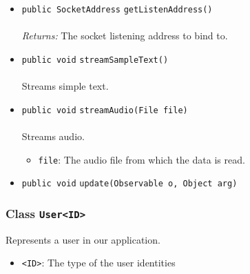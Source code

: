 \begin{itemize}
\item \lstinline|public SocketAddress| \lstinline|getListenAddress|\lstinline|()|\\ \\[-0.6em]
\emph{Returns:} The socket listening address to bind to.



\item \lstinline|public void| \lstinline|streamSampleText|\lstinline|()|\\ \\[-0.6em]
Streams simple text.



\item \lstinline|public void| \lstinline|streamAudio|\lstinline|(File file)|\\ \\[-0.6em]
Streams audio.
\begin{itemize}
\item \lstinline|file|: The audio file from which the data is read.
\end{itemize}



\item \lstinline|public void| \lstinline|update|\lstinline|(Observable o, Object arg)| \\[-0.6em]




\end{itemize}

\subsubsection{Class \lstinline|User<ID>|}
Represents a user in our application. \\
\noindent\begin{minipage}[t]{5cm}
\vspace{0.3em}
\hspace*{2em}
\vspace{0.3em}
\end{minipage}

\begin{itemize}
\item \lstinline|<ID>|: The type of the user identities
\end{itemize}



